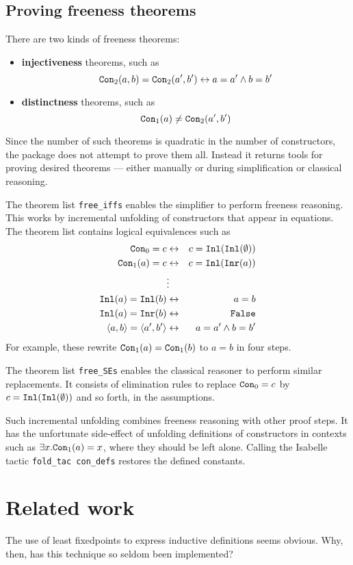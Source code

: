 \documentclass[12pt,a4paper]{article}
\newcommand\defn[1]{{\bf#1}}
\newcommand\Inl{\hbox{\tt Inl}}
\newcommand\Inr{\hbox{\tt Inr}}
\newcommand\Con{\hbox{\tt Con}}
\begin{document}
\subsection{Proving freeness theorems}
There are two kinds of freeness theorems:
\begin{itemize}
\item \defn{injectiveness} theorems, such as
\[ \Con_2(a,b) = \Con_2(a',b') \bimp a=a' \conj b=b' \]

\item \defn{distinctness} theorems, such as
\[ \Con_1(a) \not= \Con_2(a',b')  \]
\end{itemize}
Since the number of such theorems is quadratic in the number of constructors,
the package does not attempt to prove them all.  Instead it returns tools for
proving desired theorems --- either manually or during
simplification or classical reasoning.

The theorem list \verb|free_iffs| enables the simplifier to perform freeness
reasoning.  This works by incremental unfolding of constructors that appear in
equations.  The theorem list contains logical equivalences such as
\begin{eqnarray*}
  \Con_0=c      & \bimp &  c=\Inl(\Inl(\emptyset))     \\
  \Con_1(a)=c   & \bimp &  c=\Inl(\Inr(a))             \\
                & \vdots &                             \\
  \Inl(a)=\Inl(b)   & \bimp &  a=b                     \\
  \Inl(a)=\Inr(b)   & \bimp &  {\tt False}             \\
  \pair{a,b} = \pair{a',b'} & \bimp & a=a' \conj b=b'
\end{eqnarray*}
For example, these rewrite $\Con_1(a)=\Con_1(b)$ to $a=b$ in four steps.

The theorem list \verb|free_SEs| enables the classical
reasoner to perform similar replacements.  It consists of elimination rules
to replace $\Con_0=c$ by $c=\Inl(\Inl(\emptyset))$ and so forth, in the
assumptions.

Such incremental unfolding combines freeness reasoning with other proof
steps.  It has the unfortunate side-effect of unfolding definitions of
constructors in contexts such as $\exists x.\Con_1(a)=x$, where they should
be left alone.  Calling the Isabelle tactic {\tt fold\_tac con\_defs}
restores the defined constants.


\section{Related work}\label{related}
The use of least fixedpoints to express inductive definitions seems
obvious.  Why, then, has this technique so seldom been implemented?
\end{document}
